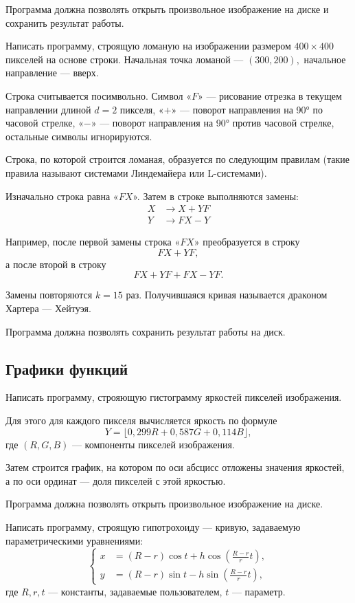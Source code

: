 Программа должна позволять открыть произвольное изображение на диске и
сохранить результат работы.

\task Написать программу, строящую ломаную на изображении размером
$400 \times 400$ пикселей на основе строки. Начальная точка ломаной —
$(300, 200),$ начальное направление — вверх.

Строка считывается посимвольно. Символ «$F$» — рисование отрезка в
текущем направлении длиной $d=2$ пикселя, «$+$» — поворот направления на
90° по часовой стрелке, «$-$» — поворот направления на 90° против
часовой стрелке, остальные символы игнорируются.

Строка, по которой строится ломаная, образуется по следующим правилам
(такие правила называют системами Линдемайера или L-системами).

Изначально строка равна «$FX$». Затем в строке выполняются замены:
\[
\begin{aligned}
  X &\to X+YF\\
  Y &\to FX-Y
\end{aligned}
\]

Например, после первой замены строка «$FX$» преобразуется в строку
\[
FX+YF,
\]
а после второй в строку
\[
FX+YF+FX-YF.
\]

Замены повторяются $k = 15$ раз. Получившаяся кривая называется
драконом Хартера — Хейтуэя.

Программа должна позволять сохранить результат работы на диск.


\subsection{Графики функций}

\task Написать программу, строяющую гистограмму яркостей пикселей
изображения.

Для этого для каждого пикселя вычисляется яркость по формуле
\[
Y = \lfloor 0{,}299 R + 0{,}587 G + 0{,}114 B \rfloor,
\]
где $(R,G,B)$ — компоненты пикселей изображения.

Затем строится график, на котором по оси абсцисс отложены значения
яркостей, а по оси ординат — доля пикселей с этой яркостью.

Программа должна позволять открыть произвольное изображение на диске.

\task Написать программу, строящую гипотрохоиду — кривую, задаваемую
параметрическими уравнениями:
\[
\left\{
  \begin{aligned}
    x &= \left( R - r \right) \cos t + h \cos \left( \frac{R-r}r t \right),\\
    y &= \left( R - r \right) \sin t - h \sin \left( \frac{R-r}r t \right),
  \end{aligned}
\right.
\]
где $R, r, t$ — константы, задаваемые пользователем, $t$ — параметр.

